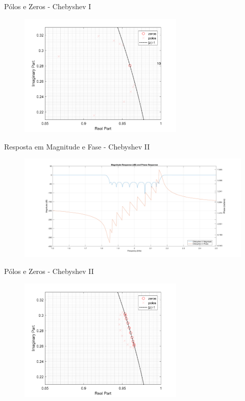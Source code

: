 \begin{frame}{Pólos e Zeros - Chebyshev I}
    \begin{figure}
        \centering
        \includegraphics[width=0.7\textwidth]{graficos/zp_c1.png}
    \end{figure}
\end{frame}

\begin{frame}{Resposta em Magnitude e Fase - Chebyshev II}
    \begin{figure}
        \centering
        \includegraphics[width=1.1\textwidth]{graficos/mag_pha_c2.png}
    \end{figure}
\end{frame}

\begin{frame}{Pólos e Zeros - Chebyshev II}
    \begin{figure}
        \centering
        \includegraphics[width=0.7\textwidth]{graficos/zp_c2.png}
    \end{figure}
\end{frame}

